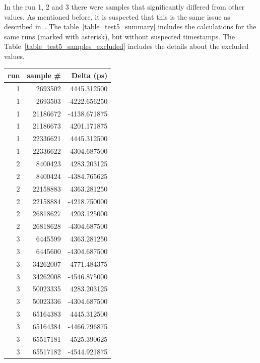 \documentclass[a4paper, 12pt]{article}
\begin{document}
In the run 1, 2 and 3 there were samples that significantly differed from
other values. As mentioned before, it is suspected that this is the same issue
as described in~\cite{tdc_perf_test}.
The table~\ref{table_test5_summary}
includes the calculations for the same runs (marked with asterisk),
but without suspected timestamps. The Table~\ref{table_test5_samples_excluded}
includes the details about the excluded values.

\begin{table}[!htb]
  \centering
  \tiny
  \begin{tabular}{|r|r|r|}
    \hline
    {\bf run } &{\bf sample \#} & {\bf Delta (ps)} \\
    \hline
    1          & 2693502  &  4445.312500   \\
    1          & 2693503  & -4222.656250   \\
    1          & 21186672 & -4138.671875   \\
    1          & 21186673 &  4201.171875   \\
    1          & 22336621 &  4445.312500   \\
    1          & 22336622 & -4304.687500   \\
    2          &  8400423 &  4283.203125   \\
    2          &  8400424 & -4384.765625   \\
    2          & 22158883 &  4363.281250   \\
    2          & 22158884 & -4218.750000   \\
    2          & 26818627 &  4203.125000   \\
    2          & 26818628 & -4304.687500   \\
    3          & 6445599  &  4363.281250   \\
    3          & 6445600  & -4304.687500   \\
    3          & 34262007 &  4771.484375   \\
    3          & 34262008 & -4546.875000   \\
    3          & 50023335 &  4283.203125   \\
    3          & 50023336 & -4304.687500   \\
    3          & 65164383 &  4445.312500   \\
    3          & 65164384 & -4466.796875   \\
    3          & 65517181 &  4525.390625   \\
    3          & 65517182 & -4544.921875   \\

\end{tabular}
\end{table}
\end{document}
